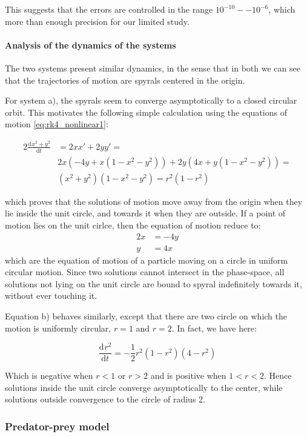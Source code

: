 \documentclass[a4paper,11]{article}
\newcommand{\derivative}[3]{\frac{\mathrm{d}^{#2} #3 }{\mathrm{d} #1^{#2}}}
\begin{document}
This suggests that the errors are controlled in the range $10^{-10}--10^{-6}$, 
which more than enough precision for our limited study.

\paragraph{Analysis of the dynamics of the systems}

The two systems present similar dynamics, in the sense that in both we can see 
that the trajectories of motion are spyrals centered in the origin. 

For system a), the spyrals seem to converge asymptotically to a closed 
circular orbit. This motivates the following simple calculation using
the equations of motion \ref{eq:rk4_nonlinear1}:

\begin{alignat*}{2}
	\derivative{t}{}{x^{2}+y^{2}} &= 2xx'+2yy' = \\
	& 2x(- 4y + x(1-x^2-y^2)) + 2y (4x + y(1-x^2-y^2)) =\\
	& (x^{2}+y^{2})(1-x^{2}-y^{2}) = r^{2}(1-r^{2})
\end{alignat*}

which proves that the solutions of motion move away from the origin when 
they lie inside the unit circle, and towards it when they are outside.
If a point of motion lies on the unit cirlce, then the equation of motion 
reduce to:
\begin{alignat*}{2}
	x &= -4y \\
	y &= 4x
\end{alignat*}
which are the equation of motion of a particle moving on a circle in uniform
circular motion. Since two solutions cannot intersect in the phase-space, all
solutions not lying on the unit circle are bound to spyral indefinitely towards
it, without ever touching it.

Equation b) behaves similarly, except that there are two circle on which 
the motion is uniformly circular, $r=1$ and $r=2$. In fact, we have here:

\[
	\derivative{t}{}{r^{2}} = -\frac{1}{2}r^{2}(1-r^{2})(4-r^{2})
\]

Which is negative when $r<1$ or $r>2$ and is positive when $1<r<2$.
Hence solutions inside the unit circle converge asymptotically to the center, 
while solutions outside convergence to the circle of radius 2.

\subsubsection{Predator-prey model}
\end{document}
